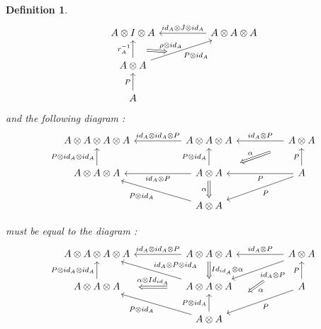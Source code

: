 \documentclass[a4paper, 12pt, twoside,openright]{report}
\newtheorem{definition}{Definition}
\begin{document}
\begin{definition}
$$\begin{tikzcd}
A \otimes I \otimes A
&&
A \otimes A \otimes A
\arrow[swap]{ll}{id_A \otimes J \otimes id_A}
\\
A \otimes A
\arrow{u}{r_{A}^{-1}}[name=A]{}
\arrow[swap]{urr}{P \otimes id_A}[name=B]{}
\\
A
\arrow{u}{P}
\arrow[Rightarrow, from=A,to=B, shorten >=0.5cm, shorten <=0.5cm]{}{\rho \otimes id_A }
\end{tikzcd}
$$
and the following diagram :
$$
\begin{tikzcd}
A \otimes A \otimes A \otimes A 
&&
A \otimes A \otimes A
\arrow[swap]{ll}{id_A \otimes id_A \otimes P}
&&
A \otimes A
\arrow[swap]{ll}{id_A \otimes P}
\arrow[Rightarrow, swap,shorten >=0.5cm, shorten <=0.5cm]{lld}{\alpha}
\\
A \otimes A \otimes A
\arrow{u}{P \otimes id_A \otimes id_A}
&&
A \otimes A
\arrow{u}{P \otimes id_A}
\arrow{ll}{id_A \otimes P}
\arrow[Rightarrow, swap,shorten >=0.0cm, shorten <=0.0cm]{d}{\alpha}
&&
A
\arrow{u}{P}
\arrow{ll}{P}
\arrow{lld}{P}
\\
&&
A \otimes A
\arrow{ull}{P \otimes id_A}
\end{tikzcd}
$$

must be equal to the diagram : 
$$
\begin{tikzcd}
A \otimes A \otimes A \otimes A 
&&
A \otimes A \otimes A
\arrow[swap]{ll}{id_A \otimes id_A \otimes P}
\arrow[swap,Rightarrow, swap,shorten >=0.0cm, shorten <=0.0cm]{d}{Id_{id_A} \otimes \alpha }
&&
A \otimes A
\arrow[swap]{ll}{id_A \otimes P}
\arrow{lld}{id_A \otimes P}
\arrow[Rightarrow, shorten >=1.2cm, shorten <=1.2cm]{lddl}{\alpha}
\\
A \otimes A \otimes A
\arrow{u}{P \otimes id_A \otimes id_A}
&&
A \otimes A \otimes A
\arrow[swap]{ull}{id_A \otimes P \otimes id_A}
\arrow[Rightarrow, swap,shorten >=0.5cm, shorten <=0.5cm]{ll}{\alpha \otimes Id_{id_A}  }
&&
A
\arrow{u}{P}
\arrow{lld}{P}
\\
&&
A \otimes A
\arrow{ull}{P \otimes id_A}
\arrow{u}{P \otimes id_A}
\end{tikzcd}
$$
\end{definition}
\end{document}
